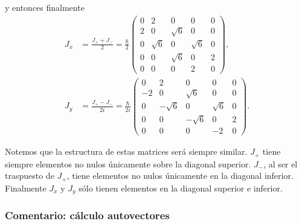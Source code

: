 \documentclass[10pt, a4paper]{article}
\numberwithin{equation}{subsection}
\begin{document}
y entonces finalmente
\begin{align}
  J_x &= \frac{J_+ + J_-}{2} = \frac{\hbar}{2}
  \begin{pmatrix}
    0 & 2 & 0 & 0 & 0 \\
    2 & 0 & \sqrt{6} & 0 & 0 \\
    0 & \sqrt{6} & 0 & \sqrt{6} & 0 \\
    0 & 0 & \sqrt{6} & 0 & 2 \\
    0 & 0 & 0 & 2 & 0
  \end{pmatrix}, \\
  J_y &= \frac{J_+ - J_-}{2i} = \frac{\hbar}{2i}
  \begin{pmatrix}
    0 & 2 & 0 & 0 & 0 \\
    -2 & 0 & \sqrt{6} & 0 & 0 \\
    0 & -\sqrt{6} & 0 & \sqrt{6} & 0 \\
    0 & 0 & -\sqrt{6} & 0 & 2 \\
    0 & 0 & 0 & -2 & 0
  \end{pmatrix}.
\end{align}

Notemos que la estructura de estas matrices será siempre similar. $J_+$ tiene
siempre elementos no nulos únicamente sobre la diagonal superior. $J_-$, al ser
el traspuesto de $J_+$, tiene elementos no nulos únicamente en la diagonal
inferior. Finalmente $J_x$ y $J_y$ sólo tienen elementos en la diagonal superior
e inferior.

\subsubsection{Comentario: cálculo autovectores}
\end{document}
